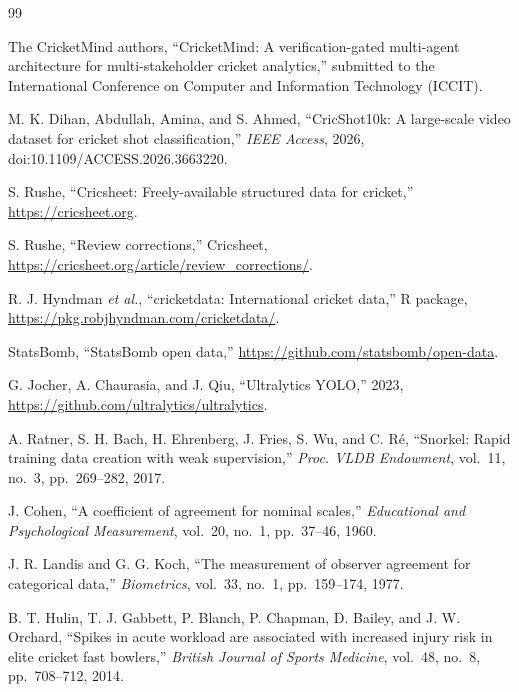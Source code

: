 \documentclass[11pt,a4paper]{article}
\begin{document}
\begin{thebibliography}{99}
\small

The CricketMind authors, ``CricketMind: A verification-gated multi-agent
architecture for multi-stakeholder cricket analytics,'' submitted to the
International Conference on Computer and Information Technology (ICCIT).

M. K. Dihan, Abdullah, Amina, and S. Ahmed, ``CricShot10k: A large-scale video
dataset for cricket shot classification,'' \emph{IEEE Access}, 2026,
doi:10.1109/ACCESS.2026.3663220.

S. Rushe, ``Cricsheet: Freely-available structured data for cricket,''
\url{https://cricsheet.org}.

S. Rushe, ``Review corrections,'' Cricsheet,
\url{https://cricsheet.org/article/review_corrections/}.

R. J. Hyndman \emph{et al.}, ``cricketdata: International cricket data,'' R
package, \url{https://pkg.robjhyndman.com/cricketdata/}.

StatsBomb, ``StatsBomb open data,''
\url{https://github.com/statsbomb/open-data}.

G. Jocher, A. Chaurasia, and J. Qiu, ``Ultralytics YOLO,'' 2023,
\url{https://github.com/ultralytics/ultralytics}.

A. Ratner, S. H. Bach, H. Ehrenberg, J. Fries, S. Wu, and C. R\'e, ``Snorkel:
Rapid training data creation with weak supervision,'' \emph{Proc. VLDB
Endowment}, vol.~11, no.~3, pp.~269--282, 2017.

J. Cohen, ``A coefficient of agreement for nominal scales,'' \emph{Educational
and Psychological Measurement}, vol.~20, no.~1, pp.~37--46, 1960.

J. R. Landis and G. G. Koch, ``The measurement of observer agreement for
categorical data,'' \emph{Biometrics}, vol.~33, no.~1, pp.~159--174, 1977.

B. T. Hulin, T. J. Gabbett, P. Blanch, P. Chapman, D. Bailey, and J. W.
Orchard, ``Spikes in acute workload are associated with increased injury risk
in elite cricket fast bowlers,'' \emph{British Journal of Sports Medicine},
vol.~48, no.~8, pp.~708--712, 2014.


\end{thebibliography}
\end{document}
